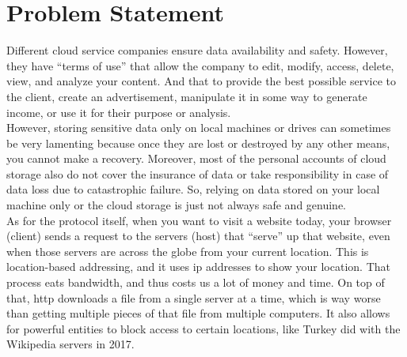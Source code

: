 \section{Problem Statement}

Different cloud service companies ensure data availability and safety. However, they have ``terms of use'' that allow the company to edit, modify, access, delete, view, and analyze your content. And that to provide the best possible service to the client, create an advertisement, manipulate it in some way to generate income, or use it for their purpose or analysis. \\

However, storing sensitive data only on local machines or drives can sometimes be very lamenting because once they are lost or destroyed by any other means, you cannot make a recovery. Moreover, most of the personal accounts of cloud storage also do not cover the insurance of data or take responsibility in case of data loss due to catastrophic failure. So, relying on data stored on your local machine only or the cloud storage is just not always safe and genuine. \\

As for the protocol itself, when you want to visit a website today, your browser (client) sends a request to the servers (host) that ``serve'' up that website, even when those servers are across the globe from your current location. This is location-based addressing, and it uses \gls{ip} addresses to show your location. That process eats \gls{bandwidth}, and thus costs us a lot of money and time. On top of that, \gls{http} downloads a file from a single server at a time, which is way worse than getting multiple pieces of that file from multiple computers. It also allows for powerful entities to block access to certain locations, like Turkey did with the Wikipedia servers in 2017.



